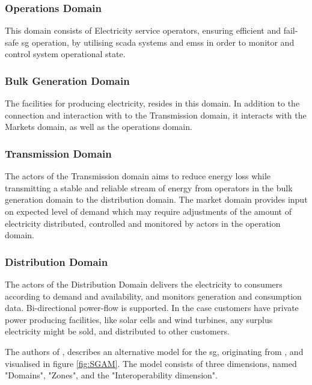     \subsubsection{Operations Domain} This domain consists of Electricity service operators, ensuring efficient and fail-safe \acrfull{sg} operation, by utilising \acrshort{scada} systems and \acrlong{ems}s in order to monitor and control system operational state.  
    \subsubsection{Bulk Generation Domain} The facilities for producing electricity, resides in this domain. In addition to the connection and interaction with  to the Transmission domain, it interacts with the Markets domain, as well as the operations domain.  
    \subsubsection{Transmission Domain} The actors of the Transmission domain aims to reduce energy loss while transmitting a stable and reliable stream of energy from operators in the bulk generation domain to the distribution domain. The market domain provides input on expected level of demand which may require adjustments of the amount of electricity distributed, controlled and monitored by actors in the operation domain.  
    \subsubsection{Distribution Domain} The actors of the Distribution Domain delivers the electricity to consumers according to demand and availability, and monitors generation and consumption data. Bi-directional power-flow is supported. In the case customers have private  power producing facilities, like solar cells and wind turbines, any surplus electricity might be sold, and distributed to other customers.



The authors of \cite{uslar2019applying}, \citeauthor{uslar2019applying} describes an alternative model for the \acrshort{sg}, originating from , and visualised in figure \ref{fig:SGAM}. The model consists of three dimensions, named "Domains", "Zones", and the "Interoperability dimension". 

